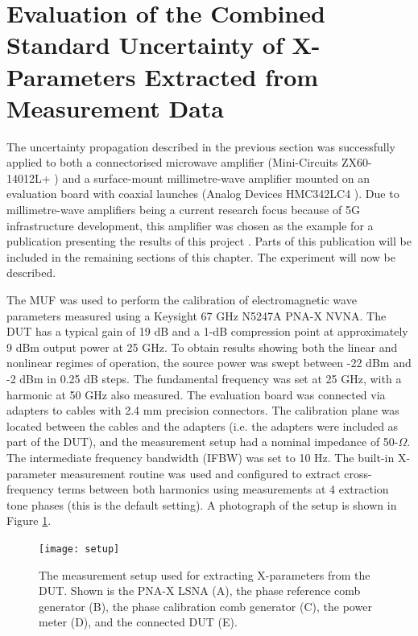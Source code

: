 \documentclass[../thesis/thesis.tex]{subfiles}
\begin{document}
\section{Evaluation of the Combined Standard Uncertainty of X-Parameters Extracted from Measurement Data}

The uncertainty propagation described in the previous section was successfully applied to both a connectorised microwave amplifier (Mini-Circuits ZX60-14012L+ \cite{minicircuits}) and a surface-mount millimetre-wave amplifier mounted on an evaluation board with coaxial launches (Analog Devices HMC342LC4 \cite{hittite_amp}). Due to millimetre-wave amplifiers being a current research focus because of 5G infrastructure development, this amplifier was chosen as the example for a publication presenting the results of this project \cite{Stant_2018_TMTT}. Parts of this publication will be included in the remaining sections of this chapter. The experiment will now be described.

The MUF was used to perform the calibration of electromagnetic wave parameters measured using a Keysight  67 GHz N5247A PNA-X NVNA. The DUT \cite{hittite_amp} has a typical gain of 19 dB and a \mbox{1-dB} compression point at approximately 9 dBm output power at 25 GHz. To obtain results showing both the linear and nonlinear regimes of operation, the source power was swept between -22 dBm and -2 dBm in 0.25 dB steps. The fundamental frequency was set at 25 GHz, with a harmonic at 50 GHz also measured. The evaluation board was connected via adapters to cables with 2.4 mm precision connectors. The calibration plane was located between the cables and the adapters (i.e. the adapters were included as part of the DUT), and the measurement setup had a nominal impedance of 50-$\Omega$. The intermediate frequency bandwidth (IFBW) was set to 10 Hz. The built-in X-parameter measurement routine was used and configured to extract cross-frequency terms between both harmonics using measurements at 4 extraction tone phases (this is the default setting). A photograph of the setup is shown in Figure \ref{ch5_fig_setup}.

\begin{figure}[t]
	\centering
	\texttt{[image: setup]}
	\caption[The measurement setup used for extracting X-parameters from the DUT.]{The measurement setup used for extracting X-parameters from the DUT. Shown is the PNA-X LSNA (A), the phase reference comb generator (B), the phase calibration comb generator (C), the power meter (D), and the connected DUT (E).}
	\label{ch5_fig_setup}
\end{figure}
\end{document}
